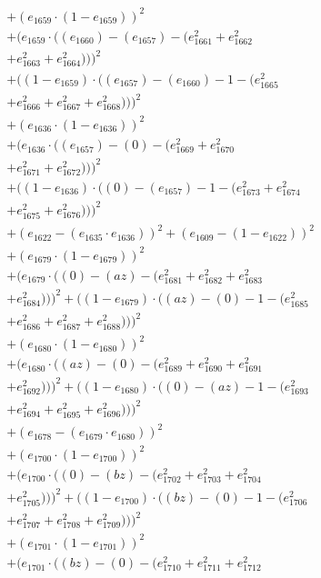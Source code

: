 \documentclass[10pt, a4paper]{article}
\begin{document}
\begin{small}
\begin{align*}
& + (e_{1659}  \cdot  (1 - e_{1659}))^{2} \\
& + (e_{1659}  \cdot  ((e_{1660}) - (e_{1657}) - (e_{1661}^{2} + e_{1662}^{2} \\
& + e_{1663}^{2} + e_{1664}^{2})))^{2} \\
& + ((1 - e_{1659})  \cdot  ((e_{1657}) - (e_{1660}) - 1 - (e_{1665}^{2} \\
& + e_{1666}^{2} + e_{1667}^{2} + e_{1668}^{2})))^{2} \\
& + (e_{1636}  \cdot  (1 - e_{1636}))^{2} \\
& + (e_{1636}  \cdot  ((e_{1657}) - (0) - (e_{1669}^{2} + e_{1670}^{2} \\
& + e_{1671}^{2} + e_{1672}^{2})))^{2} \\
& + ((1 - e_{1636})  \cdot  ((0) - (e_{1657}) - 1 - (e_{1673}^{2} + e_{1674}^{2} \\
& + e_{1675}^{2} + e_{1676}^{2})))^{2} \\
& + (e_{1622} - (e_{1635}  \cdot  e_{1636}))^{2} + (e_{1609} - (1 - e_{1622}))^{2} \\
& + (e_{1679}  \cdot  (1 - e_{1679}))^{2} \\
& + (e_{1679}  \cdot  ((0) - (az) - (e_{1681}^{2} + e_{1682}^{2} + e_{1683}^{2} \\
& + e_{1684}^{2})))^{2} + ((1 - e_{1679})  \cdot  ((az) - (0) - 1 - (e_{1685}^{2} \\
& + e_{1686}^{2} + e_{1687}^{2} + e_{1688}^{2})))^{2} \\
& + (e_{1680}  \cdot  (1 - e_{1680}))^{2} \\
& + (e_{1680}  \cdot  ((az) - (0) - (e_{1689}^{2} + e_{1690}^{2} + e_{1691}^{2} \\
& + e_{1692}^{2})))^{2} + ((1 - e_{1680})  \cdot  ((0) - (az) - 1 - (e_{1693}^{2} \\
& + e_{1694}^{2} + e_{1695}^{2} + e_{1696}^{2})))^{2} \\
& + (e_{1678} - (e_{1679}  \cdot  e_{1680}))^{2} \\
& + (e_{1700}  \cdot  (1 - e_{1700}))^{2} \\
& + (e_{1700}  \cdot  ((0) - (bz) - (e_{1702}^{2} + e_{1703}^{2} + e_{1704}^{2} \\
& + e_{1705}^{2})))^{2} + ((1 - e_{1700})  \cdot  ((bz) - (0) - 1 - (e_{1706}^{2} \\
& + e_{1707}^{2} + e_{1708}^{2} + e_{1709}^{2})))^{2} \\
& + (e_{1701}  \cdot  (1 - e_{1701}))^{2} \\
& + (e_{1701}  \cdot  ((bz) - (0) - (e_{1710}^{2} + e_{1711}^{2} + e_{1712}^{2} \\

\end{align*}
\end{small}
\end{document}

